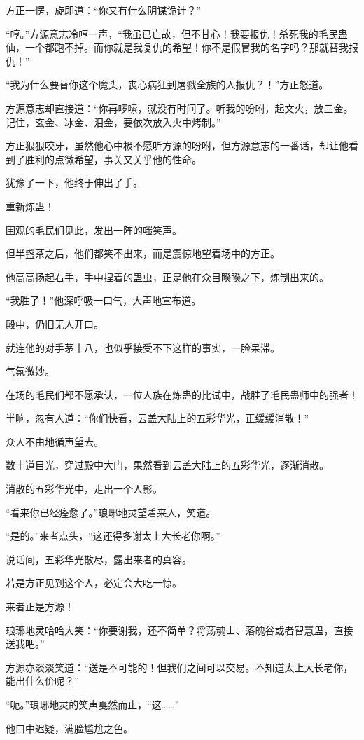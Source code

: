 \begin{this_body}
方正一愣，旋即道：“你又有什么阴谋诡计？”

“哼。”方源意志冷哼一声，“我虽已亡故，但不甘心！我要报仇！杀死我的毛民蛊仙，一个都跑不掉。而你就是我复仇的希望！你不是假冒我的名字吗？那就替我报仇！”

“我为什么要替你这个魔头，丧心病狂到屠戮全族的人报仇？！”方正怒道。

方源意志却直接道：“你再啰嗦，就没有时间了。听我的吩咐，起文火，放三金。记住，玄金、冰金、泪金，要依次放入火中烤制。”

方正狠狠咬牙，虽然他心中极不愿听方源的吩咐，但方源意志的一番话，却让他看到了胜利的点微希望，事关又关乎他的性命。

犹豫了一下，他终于伸出了手。

重新炼蛊！

围观的毛民们见此，发出一阵的嗤笑声。

但半盏茶之后，他们都笑不出来，而是震惊地望着场中的方正。

他高高扬起右手，手中捏着的蛊虫，正是他在众目睽睽之下，炼制出来的。

“我胜了！”他深呼吸一口气，大声地宣布道。

殿中，仍旧无人开口。

就连他的对手茅十八，也似乎接受不下这样的事实，一脸呆滞。

气氛微妙。

在场的毛民们都不愿承认，一位人族在炼蛊的比试中，战胜了毛民蛊师中的强者！

半晌，忽有人道：“你们快看，云盖大陆上的五彩华光，正缓缓消散！”

众人不由地循声望去。

数十道目光，穿过殿中大门，果然看到云盖大陆上的五彩华光，逐渐消散。

消散的五彩华光中，走出一个人影。

“看来你已经痊愈了。”琅琊地灵望着来人，笑道。

“是的。”来者点头，“这还得多谢太上大长老你啊。”

说话间，五彩华光散尽，露出来者的真容。

若是方正见到这个人，必定会大吃一惊。

来者正是方源！

琅琊地灵哈哈大笑：“你要谢我，还不简单？将荡魂山、落魄谷或者智慧蛊，直接送我吧。”

方源亦淡淡笑道：“送是不可能的！但我们之间可以交易。不知道太上大长老你，能出什么价呢？”

“呃。”琅琊地灵的笑声戛然而止，“这……”

他口中迟疑，满脸尴尬之色。

\end{this_body}

